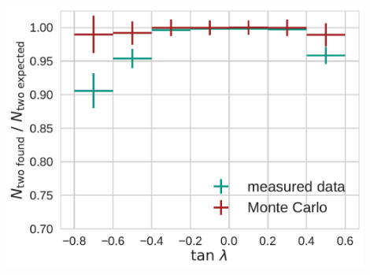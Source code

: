 \documentclass[18pt, aspectratio=169]{beamer}
\begin{document}
\begin{frame}
\begin{columns}
\begin{column}{0.33\textwidth}
      \includegraphics[width=0.9\textwidth]{figures/efficiency_study/cosmicbased_findeff_over_tan_lambda.pdf}
    \end{column}
  \end{columns}
\end{frame}
\end{document}
